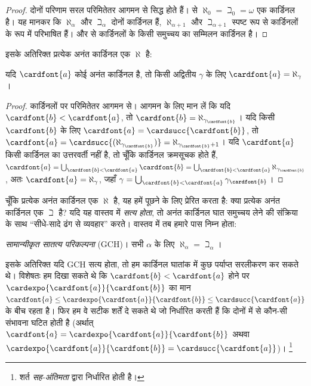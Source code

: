 \documentclass[../../../include/open-logic-section]{subfiles}
\begin{document}
\begin{proof}
दोनों परिणाम सरल परिमितेतर आगमन से सिद्ध होते हैं।
 से
$\aleph_0=\beth_0=\omega$ एक कार्डिनल है। यह मानकर कि $\aleph_\alpha$ और
$\beth_\alpha$ दोनों कार्डिनल हैं, $\aleph_{\alpha+1}$ और
$\beth_{\alpha+1}$ स्पष्ट रूप से कार्डिनलों के रूप में परिभाषित हैं। और
 से कार्डिनलों के किसी
समुच्चय का सम्मिलन कार्डिनल है।
\end{proof}
\noindent
इसके अतिरिक्त प्रत्येक अनंत कार्डिनल एक $\aleph$ है:

\begin{prop}
यदि $\cardfont{a}$ कोई अनंत कार्डिनल है, तो किसी अद्वितीय $\gamma$ के लिए
$\cardfont{a}=\aleph_\gamma$।
\end{prop}

\begin{proof}
कार्डिनलों पर परिमितेतर आगमन से। आगमन के लिए मान लें कि यदि
$\cardfont{b}<\cardfont{a}$, तो
$\cardfont{b}=\aleph_{\gamma_\cardfont{b}}$। यदि किसी $\cardfont{b}$ के
लिए $\cardfont{a}=\cardsucc{\cardfont{b}}$, तो
$\cardfont{a}=\cardsucc{(\aleph_{\gamma_\cardfont{b}})}=
\aleph_{\gamma_\cardfont{b}+1}$। यदि $\cardfont{a}$ किसी कार्डिनल का
उत्तरवर्ती नहीं है, तो चूँकि कार्डिनल क्रमसूचक होते हैं,
$\cardfont{a}=\bigcup_{\cardfont{b}<\cardfont{a}}\cardfont{b}=
\bigcup_{\cardfont{b}<\cardfont{a}}{\aleph_{\gamma_\cardfont{b}}}$,
अतः $\cardfont{a}=\aleph_\gamma$, जहाँ
$\gamma=\bigcup_{\cardfont{b}<\cardfont{a}}\gamma_\cardfont{b}$।
\end{proof}

चूँकि प्रत्येक अनंत कार्डिनल एक $\aleph$ है, यह हमें पूछने के लिए प्रेरित
करता है: क्या प्रत्येक अनंत कार्डिनल एक $\beth$ है? यदि यह वास्तव में
\emph{सत्य होता}, तो अनंत कार्डिनल घात समुच्चय लेने की संक्रिया के साथ
``सीधे-सादे ढंग से व्यवहार'' करते। वास्तव में तब हमारे पास निम्न होता:

\begin{defish}
\emph{सामान्यीकृत सातत्य परिकल्पना} (GCH)। सभी $\alpha$ के लिए
$\aleph_\alpha=\beth_\alpha$।
\end{defish}

इसके अतिरिक्त यदि GCH सत्य होता, तो हम कार्डिनल घातांक में कुछ पर्याप्त
सरलीकरण कर सकते थे। विशेषतः हम दिखा सकते थे कि
$\cardfont{b}<\cardfont{a}$ होने पर
$\cardexpo{\cardfont{a}}{\cardfont{b}}$ का मान
$\cardfont{a}\leq\cardexpo{\cardfont{a}}{\cardfont{b}}\leq
\cardsucc{\cardfont{a}}$ के बीच रहता है। फिर हम वे सटीक शर्तें दे सकते थे
जो निर्धारित करती हैं कि दोनों में से कौन-सी संभावना घटित होती है (अर्थात्
$\cardfont{a}=\cardexpo{\cardfont{a}}{\cardfont{b}}$ अथवा
$\cardexpo{\cardfont{a}}{\cardfont{b}}=\cardsucc{\cardfont{a}}$)।
\footnote{शर्त \emph{सह-अंतिमता} द्वारा निर्धारित होती है।}
\end{document}
